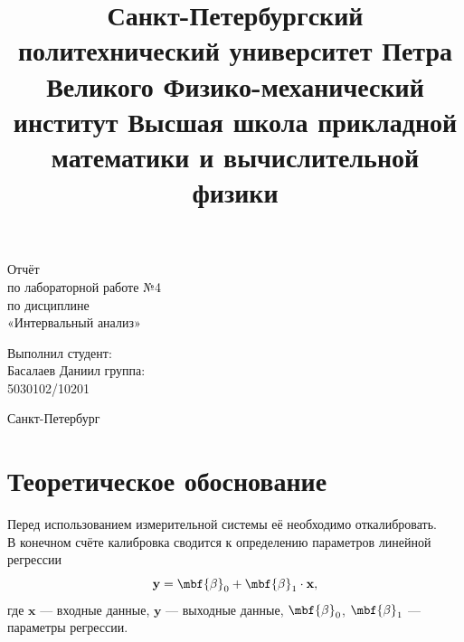 \documentclass[a4paper,12pt]{article}
\title{Санкт-Петербургский политехнический университет
Петра Великого
Физико-механический институт
Высшая школа прикладной математики и вычислительной
физики}
\date{}
\begin{document}
\maketitle
\begin{center}
{\fontsize{25}{}\selectfont Отчёт \\
по лабораторной работе №4 \\
по дисциплине \\
«Интервальный анализ»}

\end{center}
\begin{flushright}
Выполнил студент:\\
Басалаев Даниил
группа:\\
5030102/10201\\

\end{flushright}

\vspace*{\fill} \begin{center}Санкт-Петербург\end{center}

\newpage %
\tableofcontents
\newpage

\section{Теоретическое обоснование}
Перед использованием измерительной системы её необходимо откалибровать.\\
В конечном счёте калибровка сводится к определению параметров линейной регрессии
\begin{equation}
    \textbf{y} = \mbf{\beta}_0 + \mbf{\beta}_1 \cdot \textbf{x}, 
\end{equation}
где $ \textbf{x}$ --- входные данные, $\textbf{y}$ --- выходные данные, $\mbf{\beta}_0$,  $\mbf{\beta}_1$ --- параметры регрессии.
\end{document}
